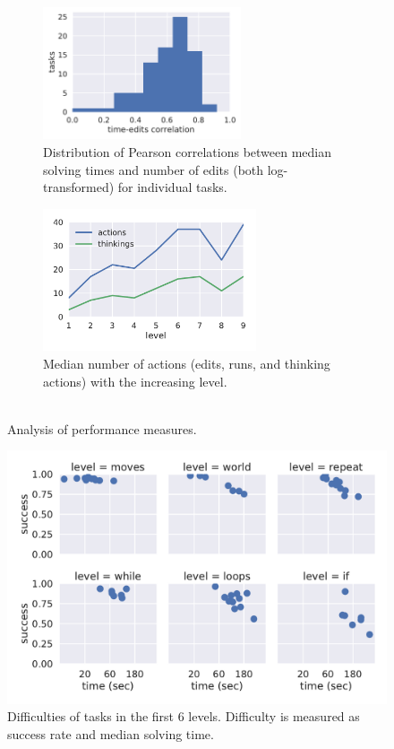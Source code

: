 \begin{figure}[htb]
\centering
\begin{subfigure}{.49\textwidth}
\centering
\includegraphics[height=39mm]{img/time-edits-corr}
\caption{
  Distribution of Pearson correlations between median solving times and number
  of edits (both log-transformed) for individual tasks.}
\label{fig:time-vs-edits}
\end{subfigure}
\begin{subfigure}{.49\textwidth}
\centering
\includegraphics[height=42mm]{img/actions-thinkings}
\caption{Median number of actions (edits, runs, and thinking actions)
  with the increasing level.\\~}
\label{fig:actions-thinkings}
\end{subfigure}
\caption{Analysis of performance measures.}
\end{figure}


\begin{figure}[htb]
\centering
\includegraphics[width=\textwidth]{img/difficulties-tasks-levels}
\caption{%
  Difficulties of tasks in the first 6 levels.
  Difficulty is measured as success rate and median solving time.}
\label{fig:difficulties-tasks-levels}
\end{figure}




